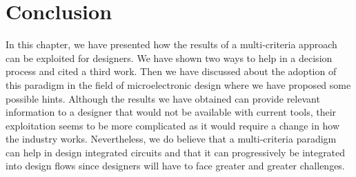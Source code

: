\section{Conclusion}
In this chapter, we have presented how the results of a multi-criteria approach can be exploited for designers. We have shown two ways to help in a decision process and cited a third work. Then we have discussed about the adoption of this paradigm in the field of microelectronic design where we have proposed some possible hints. Although the results we have obtained can provide relevant information to a designer that would not be available with current tools, their exploitation seems to be more complicated as it would require a change in how the industry works. Nevertheless, we do believe that a multi-criteria paradigm can help in design integrated circuits and that it can progressively be integrated into design flows since designers will have to face greater and greater challenges.